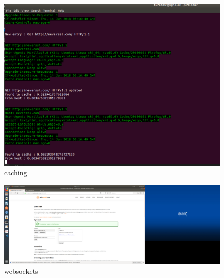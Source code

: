 \documentclass{report}
\begin{document}
    \begin{figure}[h!]
        \includegraphics[width=\linewidth]{cache.png}
        \caption{caching}
    \end{figure}

    \begin{figure}[h!]
        \includegraphics[width=\linewidth]{websockets.png}
        \caption{websockets}
    \end{figure}
\end{document}
